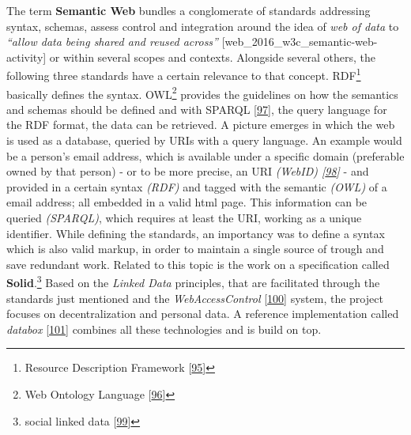 \documentclass[12pt,english,a4paper,titlepage,cleardoublepage=empty,dottedtoc]{report}
\begin{document}
The term \textbf{Semantic Web} bundles a conglomerate of standards
addressing syntax, schemas, assess control and integration around the
idea of \emph{web of data} to \emph{``allow data being shared and reused
across''} {[}web\_2016\_w3c\_semantic-web-activity{]} or within several
scopes and contexts. Alongside several others, the following three
standards have a certain relevance to that concept. RDF\footnote{Resource
  Description Framework {[}\protect\hyperlink{ref-web_w3c-tr_rdf}{95}{]}}
basically defines the syntax. OWL\footnote{Web Ontology Language
  {[}\protect\hyperlink{ref-web_w3c-tr_owl}{96}{]}} provides the
guidelines on how the semantics and schemas should be defined and with
SPARQL {[}\protect\hyperlink{ref-web_w3c-tr_sparql}{97}{]}, the query
language for the RDF format, the data can be retrieved. A picture
emerges in which the web is used as a database, queried by URIs with a
query language. An example would be a person's email address, which is
available under a specific domain (preferable owned by that person) - or
to be more precise, an URI \emph{(WebID)
{[}\protect\hyperlink{ref-web_w3c-draft_webid}{98}{]}} - and provided in
a certain syntax \emph{(RDF)} and tagged with the semantic \emph{(OWL)}
of a email address; all embedded in a valid html page. This information
can be queried \emph{(SPARQL)}, which requires at least the URI, working
as a unique identifier. While defining the standards, an importancy was
to define a syntax which is also valid markup, in order to maintain a
single source of trough and save redundant work. Related to this topic
is the work on a specification called \textbf{Solid}.\footnote{social
  linked data {[}\protect\hyperlink{ref-web_spec_solid}{99}{]}} Based on
the \emph{Linked Data} principles, that are facilitated through the
standards just mentioned and the \emph{WebAccessControl}
{[}\protect\hyperlink{ref-web_2016_wiki_webaccesscontrol}{100}{]}
system, the project focuses on decentralization and personal data. A
reference implementation called \emph{databox}
{[}\protect\hyperlink{ref-web_2016_demo_databox}{101}{]} combines all
these technologies and is build on top.
\end{document}
